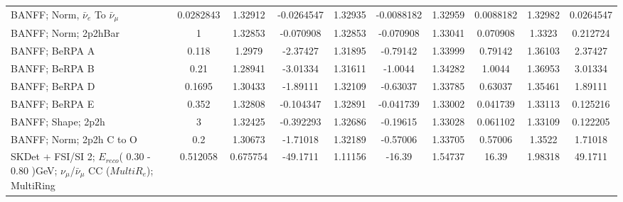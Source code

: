 \documentclass{standalone}
\begin{document}
\begin{tabular}{| l | S | S  S | S  S | S  S | S  S | }
                               BANFF; Norm, $\bar{\nu}_{e}$ To $\bar{\nu}_{\mu}$ &       0.0282843 &         1.32912 &      -0.0264547 &         1.32935 &      -0.0088182 &         1.32959 &       0.0088182 &         1.32982 &       0.0264547 \\ 
                                                            BANFF; Norm; 2p2hBar &               1 &         1.32853 &       -0.070908 &         1.32853 &       -0.070908 &         1.33041 &        0.070908 &          1.3323 &        0.212724 \\ 
                                                                  BANFF; BeRPA A &           0.118 &          1.2979 &        -2.37427 &         1.31895 &        -0.79142 &         1.33999 &         0.79142 &         1.36103 &         2.37427 \\ 
                                                                  BANFF; BeRPA B &            0.21 &         1.28941 &        -3.01334 &         1.31611 &         -1.0044 &         1.34282 &          1.0044 &         1.36953 &         3.01334 \\ 
                                                                  BANFF; BeRPA D &          0.1695 &         1.30433 &        -1.89111 &         1.32109 &        -0.63037 &         1.33785 &         0.63037 &         1.35461 &         1.89111 \\ 
                                                                  BANFF; BeRPA E &           0.352 &         1.32808 &       -0.104347 &         1.32891 &       -0.041739 &         1.33002 &        0.041739 &         1.33113 &        0.125216 \\ 
                                                              BANFF; Shape; 2p2h &               3 &         1.32425 &       -0.392293 &         1.32686 &        -0.19615 &         1.33028 &        0.061102 &         1.33109 &        0.122205 \\ 
                                                        BANFF; Norm; 2p2h C to O &             0.2 &         1.30673 &        -1.71018 &         1.32189 &        -0.57006 &         1.33705 &         0.57006 &          1.3522 &         1.71018 \\ 
SKDet + FSI/SI  2; $E_{reco}$( 0.30 - 0.80 )GeV; $\nu_{\mu}$/$\bar{\nu}_{\mu}$ CC ($MultiR_{e}$); MultiRing &        0.512058 &        0.675754 &        -49.1711 &         1.11156 &          -16.39 &         1.54737 &           16.39 &         1.98318 &         49.1711 \\ 

\end{tabular}
\end{document}
